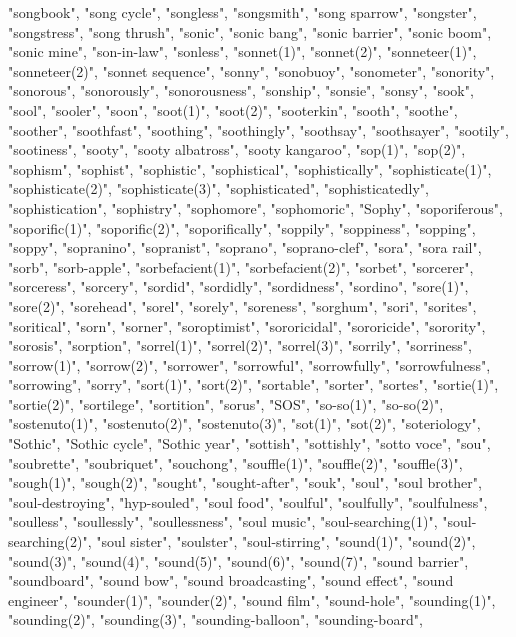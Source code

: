"songbook",
"song cycle",
"songless",
"songsmith",
"song sparrow",
"songster",
"songstress",
"song thrush",
"sonic",
"sonic bang",
"sonic barrier",
"sonic boom",
"sonic mine",
"son-in-law",
"sonless",
"sonnet(1)",
"sonnet(2)",
"sonneteer(1)",
"sonneteer(2)",
"sonnet sequence",
"sonny",
"sonobuoy",
"sonometer",
"sonority",
"sonorous",
"sonorously",
"sonorousness",
"sonship",
"sonsie",
"sonsy",
"sook",
"sool",
"sooler",
"soon",
"soot(1)",
"soot(2)",
"sooterkin",
"sooth",
"soothe",
"soother",
"soothfast",
"soothing",
"soothingly",
"soothsay",
"soothsayer",
"sootily",
"sootiness",
"sooty",
"sooty albatross",
"sooty kangaroo",
"sop(1)",
"sop(2)",
"sophism",
"sophist",
"sophistic",
"sophistical",
"sophistically",
"sophisticate(1)",
"sophisticate(2)",
"sophisticate(3)",
"sophisticated",
"sophisticatedly",
"sophistication",
"sophistry",
"sophomore",
"sophomoric",
"Sophy",
"soporiferous",
"soporific(1)",
"soporific(2)",
"soporifically",
"soppily",
"soppiness",
"sopping",
"soppy",
"sopranino",
"sopranist",
"soprano",
"soprano-clef",
"sora",
"sora rail",
"sorb",
"sorb-apple",
"sorbefacient(1)",
"sorbefacient(2)",
"sorbet",
"sorcerer",
"sorceress",
"sorcery",
"sordid",
"sordidly",
"sordidness",
"sordino",
"sore(1)",
"sore(2)",
"sorehead",
"sorel",
"sorely",
"soreness",
"sorghum",
"sori",
"sorites",
"soritical",
"sorn",
"sorner",
"soroptimist",
"sororicidal",
"sororicide",
"sorority",
"sorosis",
"sorption",
"sorrel(1)",
"sorrel(2)",
"sorrel(3)",
"sorrily",
"sorriness",
"sorrow(1)",
"sorrow(2)",
"sorrower",
"sorrowful",
"sorrowfully",
"sorrowfulness",
"sorrowing",
"sorry",
"sort(1)",
"sort(2)",
"sortable",
"sorter",
"sortes",
"sortie(1)",
"sortie(2)",
"sortilege",
"sortition",
"sorus",
"SOS",
"so-so(1)",
"so-so(2)",
"sostenuto(1)",
"sostenuto(2)",
"sostenuto(3)",
"sot(1)",
"sot(2)",
"soteriology",
"Sothic",
"Sothic cycle",
"Sothic year",
"sottish",
"sottishly",
"sotto voce",
"sou",
"soubrette",
"soubriquet",
"souchong",
"souffle(1)",
"souffle(2)",
"souffle(3)",
"sough(1)",
"sough(2)",
"sought",
"sought-after",
"souk",
"soul",
"soul brother",
"soul-destroying",
"hyp-souled",
"soul food",
"soulful",
"soulfully",
"soulfulness",
"soulless",
"soullessly",
"soullessness",
"soul music",
"soul-searching(1)",
"soul-searching(2)",
"soul sister",
"soulster",
"soul-stirring",
"sound(1)",
"sound(2)",
"sound(3)",
"sound(4)",
"sound(5)",
"sound(6)",
"sound(7)",
"sound barrier",
"soundboard",
"sound bow",
"sound broadcasting",
"sound effect",
"sound engineer",
"sounder(1)",
"sounder(2)",
"sound film",
"sound-hole",
"sounding(1)",
"sounding(2)",
"sounding(3)",
"sounding-balloon",
"sounding-board",
